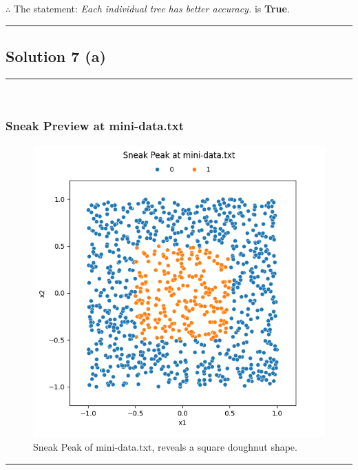 \documentclass{article}
\begin{document}
\subsubsection*{\normalfont}{$\therefore$ The statement: \textit{Each individual tree has better accuracy.} is \textbf{True}.}

\noindent\rule{\textwidth}{0.4pt}

\newpage


\subsection*{Solution 7 (a)}
\noindent\rule{\textwidth}{0.4pt}\\

\subsubsection*{Sneak Preview at mini-data.txt}

\begin{figure}[H]
  \includegraphics{hw9_q7a.png}
  \caption{Sneak Peak of mini-data.txt, reveals a square doughnut shape.}
\end{figure}

\noindent\rule{\textwidth}{0.4pt}\\
\end{document}
